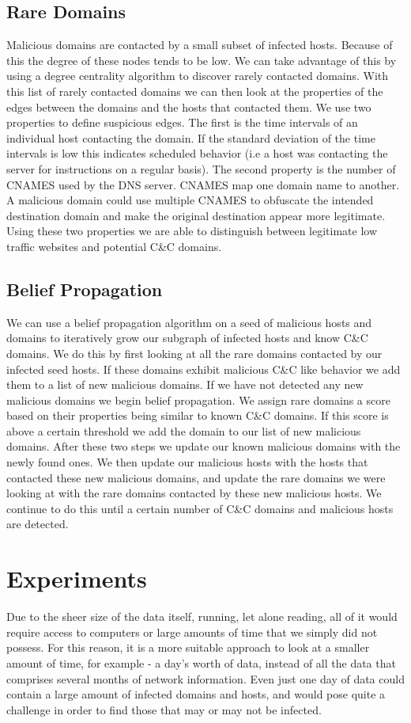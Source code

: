 \documentclass{article} %
\begin{document}
\subsection{Rare Domains}
Malicious domains are contacted by a small subset of infected hosts. Because of this the degree of these nodes tends to be low. We can take advantage of this by using a degree centrality algorithm to discover rarely contacted domains. With this list of rarely contacted domains we can then look at the properties of the edges between the domains and the hosts that contacted them. We use two properties to define suspicious edges. The first is the time intervals of an individual host contacting the domain. If the standard deviation of the time intervals is low this indicates scheduled behavior (i.e a host was contacting the server for instructions on a regular basis). The second property is the number of CNAMES used by the DNS server. CNAMES map one domain name to another. A malicious domain could use multiple CNAMES to obfuscate the intended destination domain and make the original destination appear more legitimate. Using these two properties we are able to distinguish between legitimate low traffic websites and potential C\&C domains.

\subsection{Belief Propagation}
We can use a belief propagation algorithm on a seed of malicious hosts and domains to iteratively grow our subgraph of infected hosts and know C\&C domains. We do this by first looking at all the rare domains contacted by our infected seed hosts. If these domains exhibit malicious C\&C like behavior we add them to a list of new malicious domains. If we have not detected any new malicious domains we begin belief propagation. We assign rare domains a score based on their properties being similar to known C\&C domains. If this score is above a certain threshold we add the domain to our list of new malicious domains. After these two steps we update our known malicious domains with the newly found ones. We then update our malicious hosts with the hosts that contacted these new malicious domains, and update the rare domains we were looking at with the rare domains contacted by these new malicious hosts. We continue to do this until a certain number of C\&C domains and malicious hosts are detected.

\section{Experiments}
\label{exp}
Due to the sheer size of the data itself, running, let alone reading, all of it would require access to computers or large amounts of time that we simply did not possess. For this reason, it is a more suitable approach to 
look at a smaller amount of time, for example - a day's worth of data, instead of all the data that comprises several months of network information. Even just one day of data could contain a large amount of infected domains 
and hosts, and would pose quite a challenge in order to find those that may or may not be infected.
\end{document}
